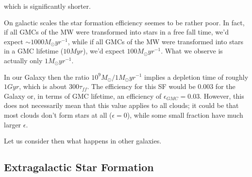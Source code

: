 which is significantly shorter.
\par On galactic scales the star formation efficiency seemes to be rather poor. In fact, if all GMCs of the MW were transformed into stars in a free fall time, we'd expect $\sim 1000 M_{\odot}\unit{yr}^{-1}$, while if all GMCs of the MW were transformed into stars in a GMC
lifetime ($10\unit{Myr}$), we'd expect $100 M_{\odot}\unit{yr}^{-1}$. What we observe is actually only $1M_{\odot}\unit{yr}^{-1}$.
\par In our Galaxy then the ratio $10^{9}M_{\odot}/1 M_{\odot}\unit{yr}^{-1}$ implies a depletion time of roughly $1\unit{Gyr}$, which is about $300\tau_{ff}$. The efficiency for this SF would be $0.003$ for the Galaxy or, in terms of GMC lifetime, an efficiency of $\epsilon_{GMC} = 0.03$. However, this does not necessarily mean that this value applies to all clouds; it could be that most clouds don’t form stars at all ($\epsilon = 0$), while some small fraction have much larger $\epsilon$.
\par Let us consider then what happens in other galaxies.

\subsection{Extragalactic Star Formation}

